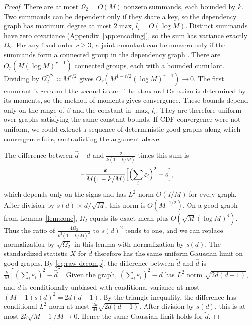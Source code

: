 \begin{proof}
There are at most $\Omega_2=O(M)$ nonzero summands, each bounded by $k$. Two summands can be dependent only if they share a key, so the dependency graph has maximum degree at most $2\max_il_i=O(\log M)$. Distinct summands have zero covariance (Appendix~\ref{app:encoding}), so the sum has variance exactly $\Omega_2$. For any fixed order $r\ge3$, a joint cumulant can be nonzero only if the summands form a connected group in the dependency graph \cite{janson1988cumulant}. There are $O_r(M(\log M)^{r-1})$ connected groups, each with a bounded cumulant. Dividing by $\Omega_2^{r/2}\asymp M^{r/2}$ gives $O_r(M^{1-r/2}(\log M)^{r-1})\to0$. The first cumulant is zero and the second is one. The standard Gaussian is determined by its moments, so the method of moments gives convergence. These bounds depend only on the range of $\beta$ and the constant in $\max_il_i$. They are therefore uniform over graphs satisfying the same constant bounds. If CDF convergence were not uniform, we could extract a sequence of deterministic good graphs along which convergence fails, contradicting the argument above.

The difference between $\widehat d-d$ and $\frac{2}{k(1-k/M)}$ times this sum is
\begin{equation*}
-\frac{k}{M(1-k/M)}\Bigl[\Bigl(\sum_i\varepsilon_i\Bigr)^2-d\Bigr],
\end{equation*}
which depends only on the signs and has $L^2$ norm $O(d/M)$ for every graph. After division by $s(d)\asymp d/\sqrt M$, this norm is $O(M^{-1/2})$. On a good graph from Lemma~\ref{lem:conc}, $\Omega_2$ equals its exact mean plus $O(\sqrt M(\log M)^4)$. Thus the ratio of $\frac{4\Omega_2}{k^2(1-k/M)^2}$ to $s(d)^2$ tends to one, and we can replace normalization by $\sqrt{\Omega_2}$ in this lemma with normalization by $s(d)$. The standardized statistic $X$ for $\widehat d$ therefore has the same uniform Gaussian limit on good graphs. By \eqref{eq:raw-decomp}, the difference between $\widetilde d$ and $\widehat d$ is $\frac kM[(\sum_i\varepsilon_i)^2-\widehat d]$. Given the graph, $(\sum_i\varepsilon_i)^2-d$ has $L^2$ norm $\sqrt{2d(d-1)}$, and $\widehat d$ is conditionally unbiased with conditional variance at most $(M-1)s(d)^2=2d(d-1)$. By the triangle inequality, the difference has conditional $L^2$ norm at most $\frac{2k}M\sqrt{2d(d-1)}$. After division by $s(d)$, this is at most $2k\sqrt{M-1}/M\to0$. Hence the same Gaussian limit holds for $\widetilde d$.
\end{proof}

